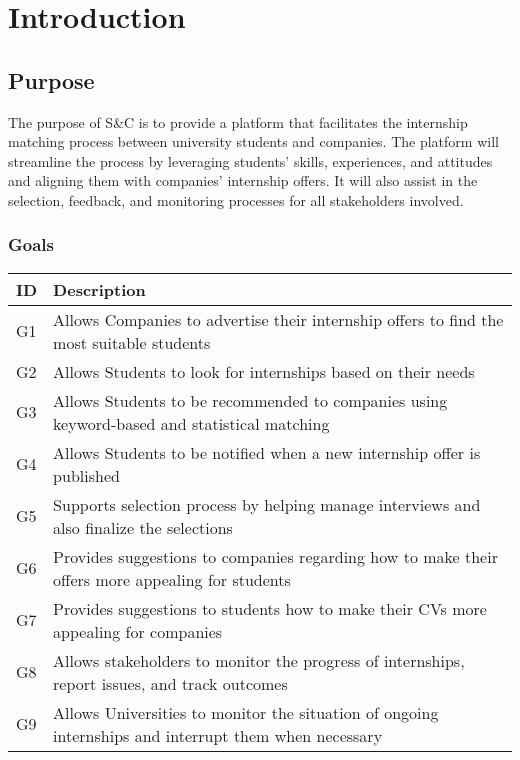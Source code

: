 \section{Introduction}

\subsection{Purpose}
The purpose of S\&C is to provide a platform that facilitates the internship matching process between university students and companies. The platform will streamline the process by leveraging students' skills, experiences, and attitudes and aligning them with companies’ internship offers. It will also assist in the selection, feedback, and monitoring processes for all stakeholders involved.

\subsubsection{Goals}
\begin{center}
    {\renewcommand{\arraystretch}{2}
    \begin{tabularx}{\textwidth}{p{2cm} X}
        \hline
        \textbf{ID} & \textbf{Description} \\ \hline
        G1 & Allows Companies to advertise their internship offers to find the most suitable students \\ \hline
        G2 & Allows Students to look for internships based on their needs \\ \hline
        G3 & Allows Students to be recommended to companies using keyword-based and statistical matching \\ \hline
        G4 & Allows Students to be notified when a new internship offer is published \\ \hline
        G5 & Supports selection process by helping manage interviews and also finalize the selections \\ \hline
        G6 & Provides suggestions to companies regarding how to make their offers more appealing for students \\ \hline
        G7 & Provides suggestions to students how to make their CVs more appealing for companies \\ \hline
        G8 & Allows stakeholders to monitor the progress of internships, report issues, and track outcomes \\ \hline
        G9 & Allows Universities to monitor the situation of ongoing internships and interrupt them when necessary \\ \hline
    \end{tabularx}}
\end{center}

